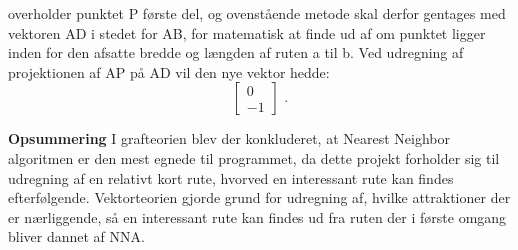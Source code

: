 overholder punktet P første del, og ovenstående metode skal derfor gentages med vektoren AD i stedet for AB, for matematisk at finde ud af om punktet ligger inden 	for den afsatte bredde og længden af ruten a til b. Ved udregning af projektionen af AP på AD vil den nye vektor hedde: \[ \begin{bmatrix} 0 \\ -1 \end{bmatrix} \text{ .} \]\newline

\textbf{Opsummering}\newline
I grafteorien blev der konkluderet, at Nearest Neighbor algoritmen er den mest egnede til programmet, da dette projekt forholder sig til udregning af en relativt kort rute, hvorved en interessant rute kan findes efterfølgende. Vektorteorien gjorde grund for udregning af, hvilke attraktioner der er nærliggende, så en interessant rute kan findes ud fra ruten der i første omgang bliver dannet af NNA.